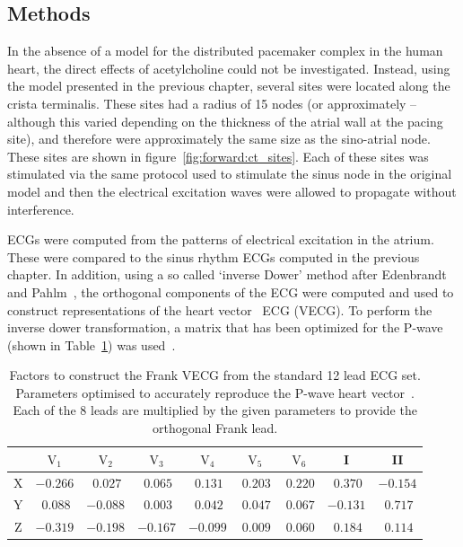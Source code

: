 \subsection{Methods}

In the absence of a model for the distributed pacemaker complex in the human
heart, the direct effects of acetylcholine could not be investigated.
Instead, using the model presented in the previous chapter, several sites were
located along the crista terminalis.
These sites had a radius of 15 nodes (or approximately --although this
varied depending on the thickness of the atrial wall at the pacing site), and
therefore were approximately the same size as the sino-atrial node.
These sites are shown in figure~\ref{fig:forward:ct_sites}.
Each of these sites was stimulated via the same protocol used to stimulate the
sinus node in the original model and then the electrical excitation waves were
allowed to propagate without interference.

ECGs were computed from the patterns of electrical excitation in the atrium.
These were compared to the sinus rhythm ECGs computed in the previous chapter.
In addition, using a so called `inverse Dower' method after Edenbrandt and
Pahlm~\cite{Edenbrandt1988}, the orthogonal components of the ECG were computed
and used to construct representations of the heart
vector~\cite{Frank1956,MacFarlane1989a} ECG (VECG).
To perform the inverse dower transformation, a matrix that has been optimized for
the P-wave (shown in Table~\ref{tbl:forward:idparams}) was
used~\cite{Guillem2007}.


\begin{table}
\caption[Inverse Dower Factors]{
\label{tbl:forward:idparams}
Factors to construct the Frank VECG from the standard 12 lead ECG set.
Parameters optimised to accurately reproduce the P-wave heart
vector~\cite{Guillem2007}.
Each of the 8 leads are multiplied by the given parameters to provide the
orthogonal Frank lead.
}
\begin{center}
\begin{tabular}{c c c c c c c c c}
\toprule
& $\text{V}_{\text{1}}$ &$\text{V}_{\text{2}}$ & $\text{V}_{\text{3}}$ &
$\text{V}_{\text{4}}$ & $\text{V}_{\text{5}}$ & $\text{V}_{\text{6}}$ & I & II \\
\midrule
X & $-0.266$ & $\:0.027$ &  $\:0.065$ & $\:0.131$ & $\:0.203$ & $\:0.220$ & $\:0.370$ & $-0.154$ \\
Y & $\:0.088$ &  $-0.088$ & $\:0.003$ & $\:0.042$ & $\:0.047$ & $\:0.067$ & $-0.131$ & $\:0.717$ \\
Z & $-0.319$ & $-0.198$ & $-0.167$ & $-0.099$ & $\:0.009$ & $\:0.060$ & $\:0.184$ & $\:0.114$ \\
\bottomrule
\end{tabular}
\end{center}
\end{table}

